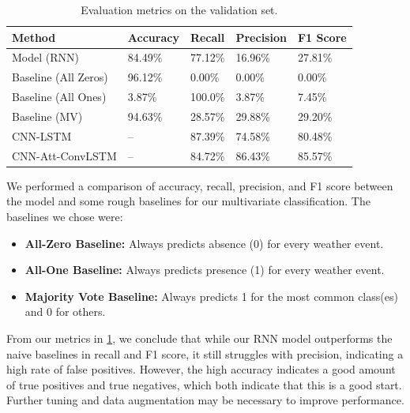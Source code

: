 \documentclass[11pt]{article}
\begin{document}
\begin{table}
  \centering
  \begin{tabular}{lllll}
    \hline
    \textbf{Method}           & \textbf{Accuracy}       & \textbf{Recall}       & \textbf{Precision}       & \textbf{F1 Score} \\
    \hline
    Model (RNN)          &           84.49\%         &           77.12\%         &           16.96\%         &           27.81\% \\
    Baseline (All Zeros) &           96.12\%         &           0.00\%          &           0.00\%          &           0.00\% \\
    Baseline (All Ones)  &           3.87\%          &           100.0\%         &           3.87\%          &           7.45\% \\
    Baseline (MV)        &           94.63\%         &           28.57\%         &           29.88\%         &           29.20\% \\
    CNN-LSTM \citep{zhao2019cnnrnnarchitecturemultilabelweather}          & – & 87.39\% & 74.58\% & 80.48\% \\
    CNN-Att-ConvLSTM \citep{zhao2019cnnrnnarchitecturemultilabelweather}          & – & 84.72\% & 86.43\% & 85.57\% \\

    \hline
  \end{tabular}
  \caption{\label{tab:results}
    Evaluation metrics on the validation set.
  }
\end{table}


We performed a comparison of accuracy, recall, precision, and F1 score between the model and some rough baselines for our multivariate classification. The baselines we chose were:
\begin{itemize}[nosep]
    \item \textbf{All-Zero Baseline:} Always predicts absence (0) for every weather event.
    \item \textbf{All-One Baseline:} Always predicts presence (1) for every weather event.
    \item \textbf{Majority Vote Baseline:} Always predicts 1 for the most common class(es) and 0 for others.
\end{itemize}

From our metrics in \ref{tab:results}, we conclude that while our RNN model outperforms the naive baselines in recall and F1 score, it still struggles with precision, indicating a high rate of false positives. However, the high accuracy indicates a good amount of true positives and true negatives, which both indicate that this is a good start. Further tuning and data augmentation may be necessary to improve performance.
\end{document}
